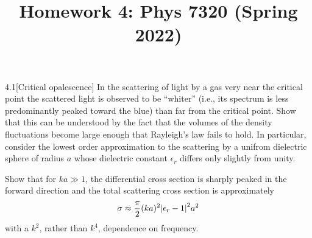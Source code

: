 \documentclass[12pt]{article}
\title{Homework 4: Phys 7320 (Spring 2022)}
\begin{document}
\maketitle
\begin{problem}{4.1}[Critical opalescence]
In the scattering of light by a gas very near the critical point the scattered
light is observed to be ``whiter'' (i.e., its spectrum is less predominantly
peaked toward the blue) than far from the critical point. Show that this can be
understood by the fact that the volumes of the density fluctuations become large
enough that Rayleigh's law fails to hold. In particular, consider the lowest
order approximation to the scattering by a unifrom dielectric sphere of radius
$a$ whose dielectric constant $\epsilon_r$ differs only slightly from unity.

Show that for $ka\gg 1$, the differential cross section is sharply peaked in the
forward direction and the total scattering cross section is approximately
\begin{equation}
    \sigma\approx\frac{\pi}{2}(ka)^2\abs{\epsilon_r-1}^2a^2 
\end{equation}
with a $k^2$, rather than $k^4$, dependence on frequency.


\end{problem}
\end{document}
